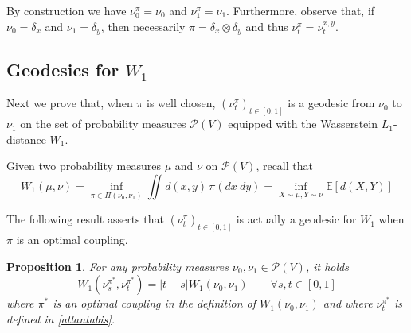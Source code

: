 \documentclass[11pt]{amsart}
\newtheorem{prop}[equation]{Proposition}
\numberwithin{equation}{section}
\begin{document}
By construction we have $\nu_0^\pi=\nu_0$ and $\nu_1^\pi=\nu_1$.
Furthermore, observe that, if $\nu_0=\delta_x$ and $\nu_1=\delta_y$, then necessarily $\pi = \delta_x \otimes \delta_y$ and
thus $\nu_t^\pi=\nu_t^{x,y}$.

\subsection{Geodesics for $W_1$}

Next we prove that, when $\pi$ is well chosen, $(\nu_t^\pi)_{t \in [0,1]}$ is a geodesic from $\nu_0$ to $\nu_1$ on the set of probability measures 
$\mathcal{P}(V)$ equipped with the Wasserstein $L_{1}$-distance $W_{1}$.

Given two probability measures $\mu$ and $\nu$ on $\mathcal{P}(V)$, recall that
$$
W_1(\mu,\nu)= \inf_{\pi \in \Pi(\nu_0,\nu_{1})} \iint d(x,y)\,\pi(dx \ dy)=\inf_{X\sim \mu, Y\sim \nu} {\mathbb{E}} [d(X,Y)]
$$

The following result asserts that $(\nu_t^\pi)_{t \in [0,1]}$ is actually a geodesic for $W_1$ when $\pi$ is an optimal coupling.

\begin{prop} \label{prop:georgia}
For any probability measures $\nu_0,\nu_1 \in \mathcal{P}(V)$, it holds
$$
W_1(\nu_s^{\pi^*},\nu_t^{\pi^*}) = |t-s| W_1(\nu_0,\nu_1) \qquad \forall s,t \in [0,1]
$$
where $\pi^*$ is an optimal coupling 
in the definition of $W_1(\nu_0,\nu_1)$ and where $\nu_t^{\pi^*}$ is defined in \eqref{atlantabis}.
\end{prop}
\end{document}
